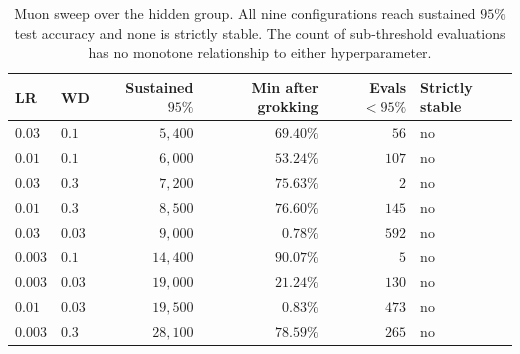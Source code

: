 \begin{table}[t]
\centering\small
\caption{Muon sweep over the hidden group. All nine configurations reach sustained $95\%$
test accuracy and none is strictly stable. The count of sub-threshold evaluations has no
monotone relationship to either hyperparameter.}
\label{tab:muon-sweep}
\begin{tabular}{llrrrl}
\toprule
LR & WD & Sustained $95\%$ & Min after grokking & Evals $<95\%$ & Strictly stable \\
\midrule
$0.03$ & $0.1$ & $5{,}400$ & $69.40\%$ & $56$ & no \\
$0.01$ & $0.1$ & $6{,}000$ & $53.24\%$ & $107$ & no \\
$0.03$ & $0.3$ & $7{,}200$ & $75.63\%$ & $2$ & no \\
$0.01$ & $0.3$ & $8{,}500$ & $76.60\%$ & $145$ & no \\
$0.03$ & $0.03$ & $9{,}000$ & $0.78\%$ & $592$ & no \\
$0.003$ & $0.1$ & $14{,}400$ & $90.07\%$ & $5$ & no \\
$0.003$ & $0.03$ & $19{,}000$ & $21.24\%$ & $130$ & no \\
$0.01$ & $0.03$ & $19{,}500$ & $0.83\%$ & $473$ & no \\
$0.003$ & $0.3$ & $28{,}100$ & $78.59\%$ & $265$ & no \\
\bottomrule
\end{tabular}
\end{table}
